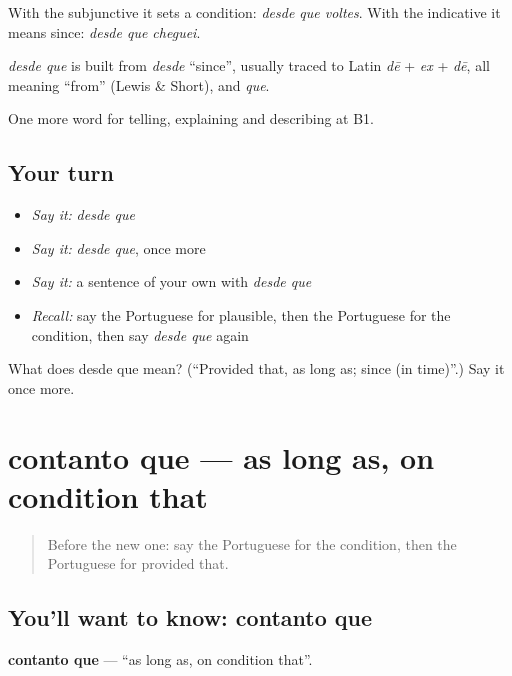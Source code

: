 With the subjunctive it sets a condition: \emph{desde que voltes}. With the indicative it means since: \emph{desde que cheguei}.

\begin{cousinweb}
\emph{desde que} is built from \emph{desde} \textquotedblleft{}since\textquotedblright{}, usually traced to Latin \emph{dē} + \emph{ex} + \emph{dē}, all meaning \textquotedblleft{}from\textquotedblright{} (Lewis \& Short), and \emph{que}.
\end{cousinweb}

\begin{grammarlens}[title={What you've built}]
One more word for telling, explaining and describing at B1.
\end{grammarlens}

\subsection*{Your turn}
\begin{itemize}
\raggedright
  \item \emph{Say it:} \emph{desde que}
  \item \emph{Say it:} \emph{desde que}, once more
  \item \emph{Say it:} a sentence of your own with \emph{desde que}
  \item \emph{Recall:} say the Portuguese for plausible, then the Portuguese for the condition, then say \emph{desde que} again
\end{itemize}

\begin{tcolorbox}[breakable,colback=teal!4,colframe=teal!35!black,title={Before you move on}]
What does desde que mean? (\textquotedblleft{}Provided that, as long as; since (in time)\textquotedblright{}.) Say it once more.
\end{tcolorbox}
\section[contanto que]{contanto que — as long as, on condition that}

\label{lesson:PT-C369-contanto-que}



\begin{quote}
Before the new one: say the Portuguese for the condition, then the Portuguese for provided that.
\end{quote}

\subsection*{You'll want to know: contanto que}
\textbf{contanto que} — \textquotedblleft{}as long as, on condition that\textquotedblright{}.

